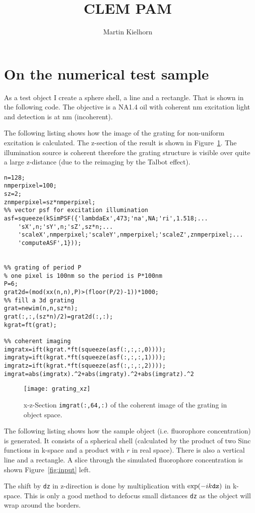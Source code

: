 \documentclass[11pt,abstracton,titlepage]{scrartcl}
\title{CLEM PAM}
\author{Martin Kielhorn} %
\newcommand{\figref}[1]{Figure~\ref{#1}}
\begin{document}
\section{On the numerical test sample}


As a test object I create a sphere shell, a line and a rectangle.
That is shown in the following code.  The objective is a NA1.4 oil
with coherent \unit[473]{nm} excitation light and detection is at
\unit[520]{nm} (incoherent).

The following listing shows how the image of the grating for
non-uniform excitation is calculated. The z-section of the result is
shown in \figref{fig:grating}. The illumination source is coherent
therefore the grating structure is visible over quite a large
z-distance (due to the reimaging by the Talbot effect).


\begin{lstlisting}
n=128;
nmperpixel=100;
sz=2;
znmperpixel=sz*nmperpixel;
%% vector psf for excitation illumination
asf=squeeze(kSimPSF({'lambdaEx',473;'na',NA;'ri',1.518;...
    'sX',n;'sY',n;'sZ',sz*n;...
    'scaleX',nmperpixel;'scaleY',nmperpixel;'scaleZ',znmperpixel;...
    'computeASF',1}));


%% grating of period P
% one pixel is 100nm so the period is P*100nm
P=6;
grat2d=(mod(xx(n,n),P)>(floor(P/2)-1))*1000;
%% fill a 3d grating
grat=newim(n,n,sz*n);
grat(:,:,(sz*n)/2)=grat2d(:,:);
kgrat=ft(grat);

%% coherent imaging
imgratx=ift(kgrat.*ft(squeeze(asf(:,:,:,0))));
imgraty=ift(kgrat.*ft(squeeze(asf(:,:,:,1))));
imgratz=ift(kgrat.*ft(squeeze(asf(:,:,:,2))));
imgrat=abs(imgratx).^2+abs(imgraty).^2+abs(imgratz).^2
\end{lstlisting}

\begin{figure}[htb]
  \centering
  \texttt{[image: grating\_xz]}

  \caption{x-z-Section {\tt imgrat(:,64,:)} of the coherent
    image of the grating in object space.}
  \label{fig:grating}
\end{figure}

The following listing shows how the sample object (i.e. fluorophore
concentration) is generated.  It consists of a spherical shell
(calculated by the product of two Sinc functions in k-space and a
product with $r$ in real space). There is also a vertical line and a
rectangle. A slice through the simulated fluorophore concentration is
shown \figref{fig:input} left.

The shift by {\tt dz} in z-direction is done by multiplication with
$\exp(-ik{\tt dz})$ in k-space. This is only a good method to defocus
small distances {\tt dz} as the object will wrap around the borders.
\end{document}
